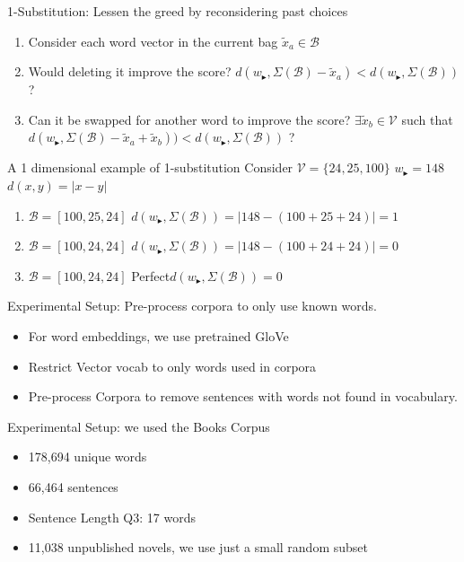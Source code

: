 \documentclass[]{beamer}
\newcommand{\x}{\tilde{x}}
\newcommand{\V}{\mathcal{V}}
\newcommand{\B}{\mathcal{B}}
\newcommand{\s}{w_{\blacktriangleright}}
\begin{document}
\begin{frame}{1-Substitution: Lessen the greed by reconsidering past choices}
	\vectorselectionproblemdefnalt
	\vfill
	\begin{enumerate}
		\item Consider each word vector in the current bag $\x_a\in\B$
		\item Would deleting it improve the score? $d(\s,\Sigma(\B)-\x_a)<d(\s,\Sigma(\B))$ ?
		\item Can it be swapped for another word to improve the score?
		$\exists \x_b\in\V$ such that
		$d(\s,\Sigma(\B)-\x_a+\x_b))<d(\s,\Sigma(\B))$ ?
	\end{enumerate}
\end{frame}

\begin{frame}{A 1 dimensional example of 1-substitution}
	\vectorselectionproblemdefnalt
	\vfill
	Consider $\V=\{24,25,100\}$ \hfill $\s=148$ \hfill $d(x,y)=|x-y|$
	\begin{enumerate}
		\item<1-> $\B=[100,25,24]$ \hfill $d(\s,\Sigma(\B))=|148-(100+25+24)|=1$ 
		\item<2-> $\B=[100,24,24]$ \hfill $d(\s,\Sigma(\B))=|148-(100+24+24)|=0$ 
		\item<3-> $\B=[100,24,24]$ \hfill Perfect\hfill $d(\s,\Sigma(\B))=0$ 
	\end{enumerate}
	\vfill
	\vfill
\end{frame}


\begin{frame}{Experimental Setup: Pre-process corpora to only use known words.}
	\begin{itemize}
		\item<1-> For word embeddings, we use pretrained GloVe 
		\item<2-> Restrict Vector vocab to only words used in corpora
		\item<2-> Pre-process Corpora to remove sentences with words not found in vocabulary.
	\end{itemize}
\end{frame}

\begin{frame}{Experimental Setup: we used the Books Corpus}

	\begin{itemize}
		\item 178,694 unique words
		\item 66,464 sentences 
		\item Sentence Length Q3: 17 words
		\item 11,038 unpublished novels, we use just a small random subset
	\end{itemize}

\end{frame}
\end{document}
